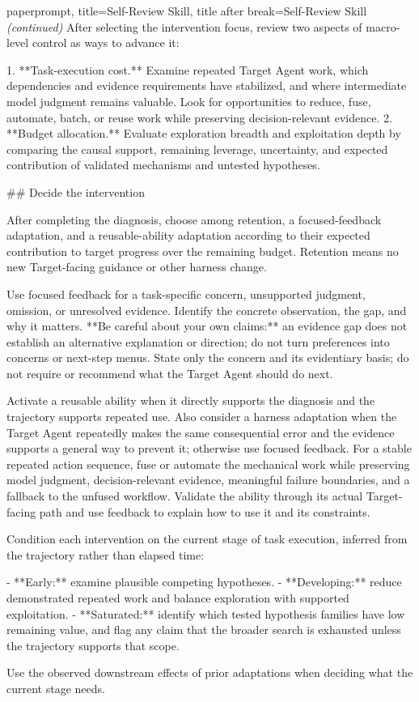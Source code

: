 \begin{tcblisting}{paperprompt,
  title={Self-Review Skill},
  title after break={Self-Review Skill \normalfont\itshape (continued)}
}
After selecting the intervention focus, review two aspects of macro-level control as ways to advance it:

1. **Task-execution cost.** Examine repeated Target Agent work, which dependencies and evidence requirements have stabilized, and where intermediate model judgment remains valuable. Look for opportunities to reduce, fuse, automate, batch, or reuse work while preserving decision-relevant evidence.
2. **Budget allocation.** Evaluate exploration breadth and exploitation depth by comparing the causal support, remaining leverage, uncertainty, and expected contribution of validated mechanisms and untested hypotheses.

## Decide the intervention

After completing the diagnosis, choose among retention, a focused-feedback adaptation, and a reusable-ability adaptation according to their expected contribution to target progress over the remaining budget. Retention means no new Target-facing guidance or other harness change.

Use focused feedback for a task-specific concern, unsupported judgment, omission, or unresolved evidence. Identify the concrete observation, the gap, and why it matters. **Be careful about your own claims:** an evidence gap does not establish an alternative explanation or direction; do not turn preferences into concerns or next-step menus. State only the concern and its evidentiary basis; do not require or recommend what the Target Agent should do next.

Activate a reusable ability when it directly supports the diagnosis and the trajectory supports repeated use. Also consider a harness adaptation when the Target Agent repeatedly makes the same consequential error and the evidence supports a general way to prevent it; otherwise use focused feedback. For a stable repeated action sequence, fuse or automate the mechanical work while preserving model judgment, decision-relevant evidence, meaningful failure boundaries, and a fallback to the unfused workflow. Validate the ability through its actual Target-facing path and use feedback to explain how to use it and its constraints.

Condition each intervention on the current stage of task execution, inferred from the trajectory rather than elapsed time:

- **Early:** examine plausible competing hypotheses.
- **Developing:** reduce demonstrated repeated work and balance exploration with supported exploitation.
- **Saturated:** identify which tested hypothesis families have low remaining value, and flag any claim that the broader search is exhausted unless the trajectory supports that scope.

Use the observed downstream effects of prior adaptations when deciding what the current stage needs.
\end{tcblisting}
